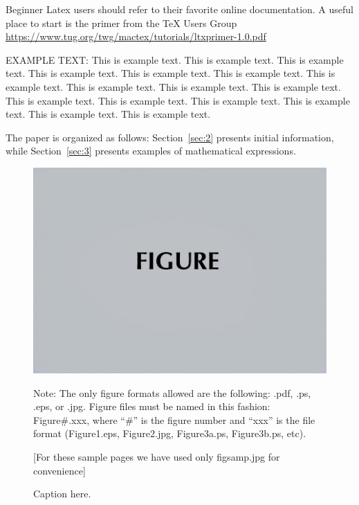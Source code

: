 \documentclass[preprint]{JASA}
\begin{document}
  Beginner Latex users should refer to their favorite online documentation. A 
  useful place to start is the primer from the TeX Users Group 
  \url{https://www.tug.org/twg/mactex/tutorials/ltxprimer-1.0.pdf}


EXAMPLE TEXT: This is example text. This is example text. This is example text. This is example text. This is example text. This is example text. This is example text. This is example text. This is example text. This is example text. This is example text. This is example text. This is example text. This is example text. This is example text. This is example text. 

The paper is organized as follows: Section~\ref{sec:2} presents
initial information, while
Section~\ref{sec:3} presents examples of mathematical expressions.

 
\begin{figure}[ht]
\includegraphics[width=\reprintcolumnwidth]{figsamp.jpg}
\caption{\label{fig:FIG1}{Caption here.}}

\raggedright
Note: The only figure formats allowed are the following: 
.pdf, .ps, .eps, or .jpg. Figure files must be named in this fashion:
Figure\#.xxx, where ``\#'' is the figure number and ``xxx'' is the file format
(Figure1.eps, Figure2.jpg, Figure3a.ps, Figure3b.ps, etc). 

[For these sample pages we have used only figsamp.jpg for convenience]
\end{figure}
\end{document}
